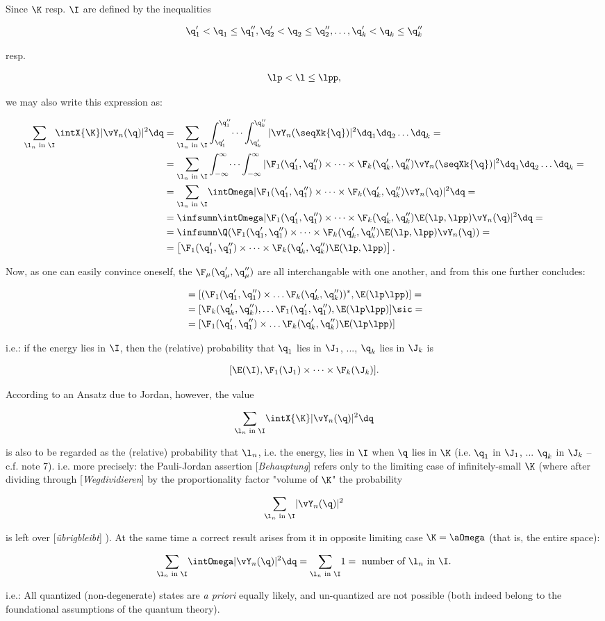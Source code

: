 \documentclass{article}
\newcommand{\WTF}[1]{
[\it{\small{#1}}]
}
\newcommand{\uequ}[1]{
\begin{align*}
#1
\end{align*}
}
\newcommand{\CC}[1]{{#1^{*}}}
\renewcommand{\it}[1]{\textit{#1}}
\newcommand{\sumX}[1]{\underset{#1}{\sum}}
\newcommand{\intXY}[2]{\int_{#1}^{#2}}
\begin{document}
Since $\K$ resp. $\I$ are defined by the inequalities
\uequ{
\q_1' < \q_1 \leq \q_1'', \q_2' < \q_2 \leq \q_2'', \dots, \q_k' < \q_k \leq \q_k''
}
resp.
\uequ{
\lp < \l \leq \lpp,
}
we may also write this expression as:
\uequ{
\sumX{\l_n \text{ in } \I}\intX{\K}|\vY_n(\q)|^2\dq 
&= \sumX{\l_n \text{ in } \I}\intXY{\q_1'}{\q_1''}\dots\intXY{\q_k'}{\q_k''}
|\vY_n(\seqXk{\q})|^2\dq_1\dq_2\dots\dq_k = \\
&= \sumX{\l_n \text{ in } \I}\intXY{-\infty}{\infty}\dots\intXY{-\infty}{\infty}
|\F_1(\q_1',\q_1'')\times\dots\times\F_k(\q_k',\q_k'')\vY_n(\seqXk{\q})|^2\dq_1\dq_2\dots\dq_k = \\
&= \sumX{\l_n \text{ in } \I}\intOmega
|\F_1(\q_1',\q_1'')\times\dots\times\F_k(\q_k',\q_k'')\vY_n(\q)|^2\dq = \\
&= \infsumn\intOmega
|\F_1(\q_1',\q_1'')\times\dots\times\F_k(\q_k',\q_k'')\E(\lp,\lpp)\vY_n(\q)|^2\dq = \\
&= \infsumn\Q(\F_1(\q_1',\q_1'')\times\dots\times\F_k(\q_k',\q_k'')\E(\lp,\lpp)\vY_n(\q)) =\\
&= \left[\F_1(\q_1',\q_1'')\times\dots\times\F_k(\q_k',\q_k'')\E(\lp,\lpp)\right].
}
Now, as one can easily convince oneself, the $\F_\mu(\q_\mu',\q_\mu'')$ are all interchangable with one another, and from this one further concludes:
\uequ{
&= [\CC{(\F_1(\q_1',\q_1'')\times\dots\F_k(\q_k',\q_k''))},\E(\lp\lpp)] =\\
&= [\F_k(\q_k',\q_k''), \dots\F_1(\q_1',\q_1''),\E(\lp\lpp)]\sic =\\
&= [\F_1(\q_1',\q_1'')\times\dots\F_k(\q_k',\q_k'')\E(\lp\lpp)]
}
i.e.: if the energy lies in $\I$, then the (relative) probability that $\q_1$ lies in $\J_1$, ..., $\q_k$ lies in $\J_k$ is
\uequ{
[\E(\I),\F_1(\J_1)\times\dots\times\F_k(\J_k)].
}
According to an Ansatz due to Jordan, however, the value
\uequ{
\sumX{\l_n\text{ in }\I}\intX{\K}|\vY_n(\q)|^2\dq
}
is also to be regarded as the (relative) probability that $\l_n$, i.e. the energy, lies in $\I$ when $\q$ lies in $\K$ (i.e. $\q_1$ in $\J_1$, ... $\q_k$ in $\J_k$ -- c.f. note 7). i.e. more precisely: the Pauli-Jordan assertion\WTF{Behauptung} refers only to the limiting case of infinitely-small $\K$ (where after dividing through\WTF{Wegdividieren} by the proportionality factor "volume of $\K$" the probability 
\uequ{
\sumX{\l_n\text{ in } \I}|\vY_n(\q)|^2
}
is left over\WTF{übrigbleibt}). At the same time a correct result arises from it in opposite limiting case $\K=\aOmega$ (that is, the entire space):
\uequ{
\sumX{\l_n \text{ in } \I}\intOmega |\vY_n(\q)|^2\dq = 
\sumX{\l_n \text{ in } \I} 1 = \text{ number of $\l_n$ in $\I$}.
}
i.e.: All quantized (non-degenerate) states are \it{a priori} equally likely, and un-quantized are not possible (both indeed belong to the foundational assumptions of the quantum theory).
\end{document}
